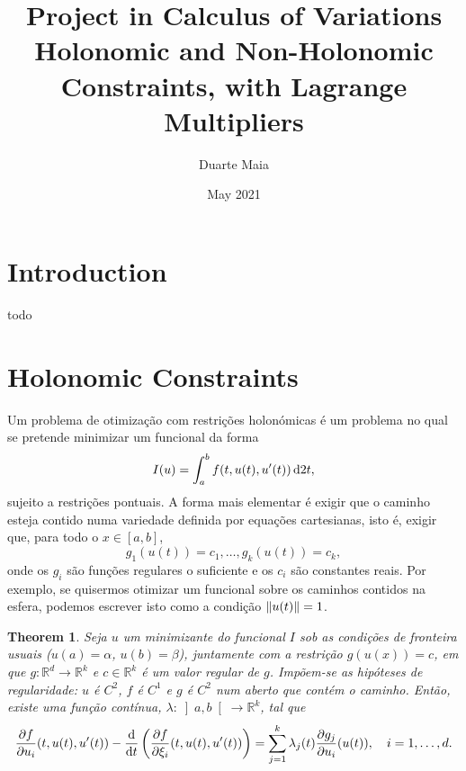 \documentclass{article}
\title{Project in Calculus of Variations\\
\large Holonomic and Non-Holonomic Constraints, with Lagrange Multipliers}
\author{Duarte Maia}
\date{May 2021}
\newtheorem{theorem}{Theorem}
\theoremstyle{nonumberplain}
\newcommand{\R}{\mathbb{R}}
\DeclarePairedDelimiter\norm{\lVert}{\rVert}
\begin{document}
\maketitle

\section{Introduction}

todo

\section{Holonomic Constraints}

Um problema de otimização com restrições holonómicas é um problema no qual se pretende minimizar um funcional da forma
\[I(u) = \int_a^b f(t,u(t),u'(t)) \dl2 t,\]
sujeito a restrições pontuais. A forma mais elementar é exigir que o caminho esteja contido numa variedade definida por equações cartesianas, isto é, exigir que, para todo o $x \in [a,b]$,
\[g_1(u(t)) = c_1, \dots, g_k(u(t)) = c_k,\]
onde os $g_i$ são funções regulares o suficiente e os $c_i$ são constantes reais. Por exemplo, se quisermos otimizar um funcional sobre os caminhos contidos na esfera, podemos escrever isto como a condição $\norm{u(t)} = 1$.

\begin{theorem}
Seja $u$ um minimizante do funcional $I$ sob as condições de fronteira usuais ($u(a) = \alpha$, $u(b) = \beta$), juntamente com a restrição $g(u(x)) = c$, em que $g \colon \R^d \to \R^k$ e $c \in \R^k$ é um valor regular de $g$. Impõem-se as hipóteses de regularidade: $u$ é $C^2$, $f$ é $C^1$ e $g$ é $C^2$ num aberto que contém o caminho. Então, existe uma função contínua, $\lambda \colon \left]a,b\right[ \to \R^k$, tal que
\[\diffp f {u_i}(t,u(t),u'(t)) - \diff*{\left(\diffp f {\xi_i}(t,u(t),u'(t))\right)}t = \sum_{j=1}^k \lambda_j(t) \diffp {g_j} {u_i} (u(t)), \quad i = 1, \dots, d.\]
\end{theorem}
\end{document}

